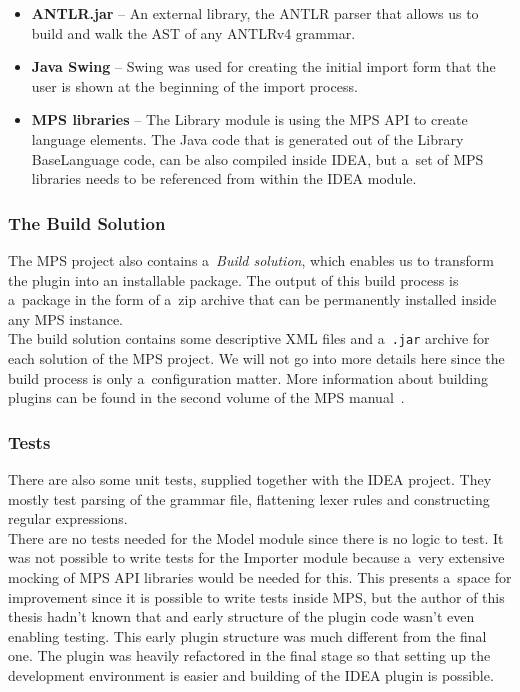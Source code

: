 \begin{itemize}
	\item \textbf{ANTLR.jar} -- An external library, the ANTLR parser that allows us to build and walk the AST of any ANTLRv4 grammar.

	\item \textbf{Java Swing} -- Swing was used for creating the initial import form that the user is shown at the beginning of the import process.

	\item \textbf{MPS libraries} -- The Library module is using the MPS API to create language elements. The Java code that is generated out of the Library BaseLanguage code, can be also compiled inside IDEA, but a~set of MPS libraries needs to be referenced from within the IDEA module.
\end{itemize}

\subsubsection{The Build Solution}
\label{chap:the_build_solution}

The MPS project also contains a~\textit{Build solution}, which enables us to transform the plugin into an installable package.
The output of this build process is a~package in the form of a~zip archive that can be permanently installed inside any MPS instance.
\\

The build solution contains some descriptive XML files and a~\texttt{.jar} archive for each solution of the MPS project.
We will not go into more details here since the build process is only a~configuration matter.
More information about building plugins can be found in the second volume of the MPS manual~\cite{MPS2}.

\subsubsection{Tests}

There are also some unit tests, supplied together with the IDEA project.
They mostly test parsing of the grammar file, flattening lexer rules and constructing regular expressions.
\\

There are no tests needed for the Model module since there is no logic to test.
It was not possible to write tests for the Importer module because a~very extensive mocking of MPS API libraries would be needed for this.
This presents a~space for improvement since it is possible to write tests inside MPS, but the author of this thesis hadn't known that and early structure of the plugin code wasn't even enabling testing.
This early plugin structure was much different from the final one.
The plugin was heavily refactored in the final stage so that setting up the development environment is easier and building of the IDEA plugin is possible.

